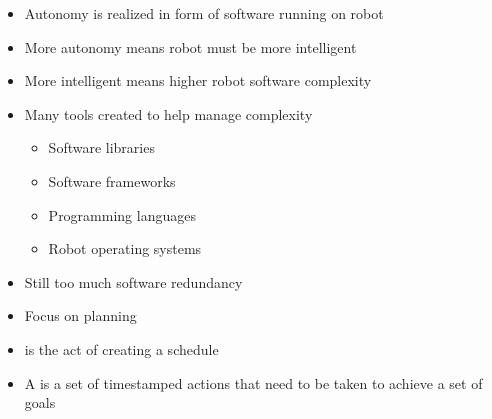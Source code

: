\documentclass{beamer}
\begin{document}
\begin{frame}
	\begin{itemize}
	\item Autonomy is realized in form of software running on robot
	\item More autonomy means robot must be more intelligent
	\item More intelligent means higher robot software complexity
	\item Many tools created to help manage complexity
		\begin{itemize}
		\item Software libraries
		\item Software frameworks
		\item Programming languages
		\item Robot operating systems
		\end{itemize}
	\item Still too much software redundancy
	\end{itemize}
\end{frame} 

\begin{frame}
	\begin{itemize}
	\item Focus on planning
	\item {} is the act of creating a schedule
	\item A  is a set of timestamped actions that need to be taken to achieve a set of goals
	\end{itemize}
\end{frame}

\begin{frame}
\end{frame}

\begin{frame}
\end{frame}
\end{document}
